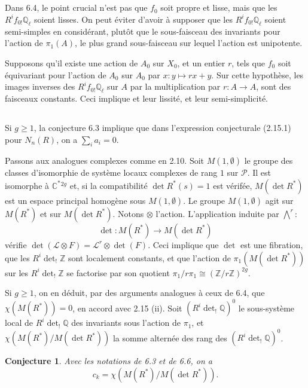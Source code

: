 \documentclass[11pt,a4paper]{article}
\theoremstyle{plain}
\newtheorem{conjecture}[theorem]{Conjecture}
\theoremstyle{definition}
\newcommand{\Q}{\mathbb{Q}}
\newcommand{\Z}{\mathbb{Z}}
\newcommand{\C}{\mathbb{C}}
\begin{document}
\subsection{}
Dans 6.4, le point crucial n'est pas que $f_0$ soit propre et lisse, mais que les $R^i f_{0!} \Q_\ell$ soient lisses. On peut \'eviter d'avoir \`a supposer que les $R^i f_{0!} \Q_\ell$ soient semi-simples en consid\'erant, plut\^ot que le sous-faisceau des invariants pour l'action de $\pi_1(A)$, le plus grand sous-faisceau sur lequel l'action est unipotente.

Supposons qu'il existe une action de $A_0$ sur $X_0$, et un entier $r$, tels que $f_0$ soit \'equivariant pour l'action de $A_0$ sur $A_0$ par $x: y \mapsto rx + y$. Sur cette hypoth\`ese, les images inverses des $R^i f_{0!} \Q_\ell$ sur $A$ par la multiplication par $r: A \to A$, sont des faisceaux constants. Ceci implique et leur lissit\'e, et leur semi-simplicit\'e.

\subsection{}
Si $g \geq 1$, la conjecture 6.3 implique que dans l'expression conjecturale (2.15.1) pour $N_n(R)$, on a $\sum_i a_i = 0$.

Passons aux analogues complexes comme en 2.10. Soit $M(1, \emptyset)$ le groupe des classes d'isomorphie de syst\`eme locaux complexes de rang $1$ sur $\mathcal{P}$. Il est isomorphe \`a $\C^*{}^{2g}$ et, si la compatibilit\'e $\det R^*(s) = 1$ est v\'erif\'ee, $M(\det R^*)$ est un espace principal homog\`ene sous $M(1, \emptyset)$. Le groupe $M(1, \emptyset)$ agit sur $M(R^*)$ et sur $M(\det R^*)$. Notons $\otimes$ l'action. L'application induite par $\bigwedge^r$:
\[
\det: M(R^*) \longrightarrow M(\det R^*)
\]
v\'erifie $\det(\mathcal{L} \otimes F) = \mathcal{L}^r \otimes \det(F)$. Ceci implique que $\det$ est une fibration, que les $R^i \det_! \Z$ sont localement constants, et que l'action de $\pi_1(M(\det R^*))$ sur les $R^i \det_! \Z$ se factorise par son quotient $\pi_1/r\pi_1 \cong (\Z/r\Z)^{2g}$.

Si $g \geq 1$, on en d\'eduit, par des arguments analogues \`a ceux de 6.4, que $\chi(M(R^*)) = 0$, en accord avec 2.15 (ii). Soit $(R^i \det_! \Q)^0$ le sous-syst\`eme local de $R^i \det_! \Q$ des invariants sous l'action de $\pi_1$, et $\chi(M(R^*)/M(\det R^*))$ la somme altern\'ee des rang des $(R^i \det_! \Q)^0$.

\begin{conjecture}
Avec les notations de 6.3 et de 6.6, on a
\[
c_k = \chi(M(R^*)/M(\det R^*)).
\]
\end{conjecture}
\end{document}
